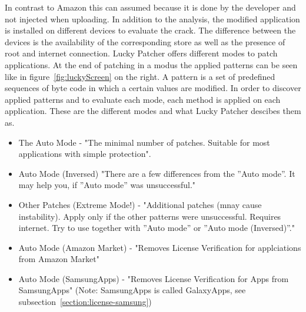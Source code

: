 In contrast to Amazon this can assumed because it is done by the developer and not injected when uploading.
\newline
In addition to the analysis, the modified application is installed on different devices to evaluate the crack.
The difference between the devices is the availability of the corresponding store as well as the presence of root and internet connection.
\newline
Lucky Patcher offers different modes to patch applications.
At the end of patching in a modus the applied patterns can be seen like in figure~\ref{fig:luckyScreen} on the right.
A pattern is a set of predefined sequences of byte code in which a certain values are modified.
In order to discover applied patterns and to evaluate each mode, each method is applied on each application.
\newline
These are the different modes and what Lucky Patcher descibes them as.
\begin{itemize}
\item The Auto Mode - "The minimal number of patches. Suitable for most applications with simple protection".
\item Auto Mode (Inversed) "There are a few differences from the ”Auto mode”. It may help you, if ”Auto mode” was unsuccessful."
\item Other Patches (Extreme Mode!) - "Additional patches (mnay cause instability). Apply only if the other patterns were unsuccessful. Requires internet. Try to use together with ”Auto mode” or ”Auto mode (Inversed)”."
\item Auto Mode (Amazon Market) - "Removes License Verification for applciations from Amazon Market"
\item Auto Mode (SamsungApps) - "Removes License Verification for Apps from SamsungApps" (Note: SamsungApps is called GalaxyApps, see subsection~\ref{section:license-samsung})
\end{itemize}
